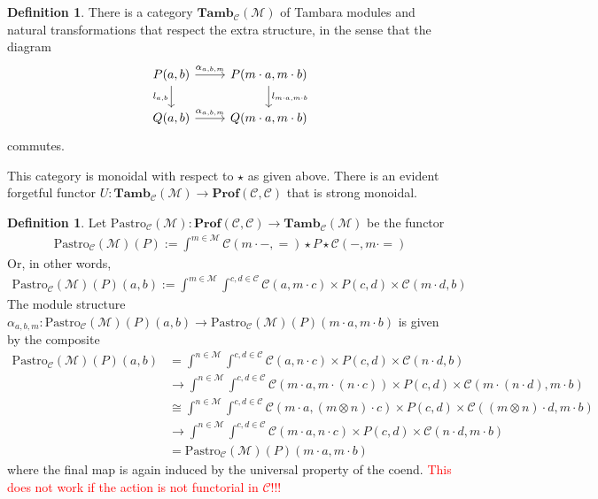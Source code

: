 \documentclass[11pt,a4paper]{amsart}
\theoremstyle{plain}
\theoremstyle{definition}
\newtheorem{definition}[theorem]{Definition}
\newcommand{\C}{\mathscr{C}}
\newcommand{\M}{\mathscr{M}}
\newcommand{\Prof}{\mathbf{Prof}}
\newcommand{\Tamb}{\mathbf{Tamb}}
\newcommand{\todo}[1]{\textcolor{red}{\small #1}}
\begin{document}
\begin{definition}
There is a category $\Tamb_\C(\M)$ of Tambara modules and natural transformations that respect the extra structure, in the sense that the diagram
\[
\begin{tikzcd}
P(a,b) \ar[r, "\alpha_{a,b,m}"] \ar[d, "l_{a,b}" left] & P(m \cdot a, m \cdot b) \ar[d, "l_{m\cdot a,m\cdot b}" right] \\
Q(a,b) \ar[r, "\alpha_{a,b,m}"] & Q(m \cdot a, m \cdot b)
\end{tikzcd}
\]
commutes.
\end{definition}

This category is monoidal with respect to $\star$ as given above. There is an evident forgetful functor $U : \Tamb_\C(\M) \to \Prof(\C, \C)$ that is strong monoidal.

\begin{definition}
Let $\mathrm{Pastro}_\C(\M) : \Prof(\C, \C) \to \Tamb_\C(\M)$ be the functor
\begin{align*}
\mathrm{Pastro}_\C(\M)(P) := \int^{m \in \M} \C(m \cdot -, =) \star P \star \C(-, m \cdot =)
\end{align*}
Or, in other words, 
\begin{align*}
\mathrm{Pastro}_\C(\M)(P)(a,b) := \int^{m \in \M} \int^{c,d \in \C} \C(a, m \cdot c) \times P(c,d) \times  \C(m \cdot d, b)
\end{align*}
The module structure $\alpha_{a,b,m} : \mathrm{Pastro}_\C(\M)(P)(a, b) \to \mathrm{Pastro}_\C(\M)(P)(m \cdot a, m \cdot b)
$ is given by the composite
\begin{align*}
\mathrm{Pastro}_\C(\M)(P)(a,b) &= \int^{n \in \M} \int^{c,d \in \C} \C(a, n \cdot c) \times P(c,d) \times  \C(n \cdot d, b) \\
&\to \int^{n \in \M} \int^{c,d \in \C} \C(m \cdot a, m \cdot (n \cdot c)) \times P(c,d) \times  \C(m \cdot (n \cdot d), m \cdot b) \\
&\cong \int^{n \in \M} \int^{c,d \in \C} \C(m \cdot a, (m \otimes n) \cdot c) \times P(c,d) \times  \C((m \otimes n) \cdot d, m \cdot b) \\
&\to \int^{n \in \M} \int^{c,d \in \C} \C(m \cdot a, n \cdot c) \times P(c,d) \times  \C(n \cdot d, m \cdot b) \\
&= \mathrm{Pastro}_\C(\M)(P)(m \cdot a, m \cdot b)
\end{align*}
where the final map is again induced by the universal property of the coend. \todo{This does not work if the action is not functorial in $\C$!!!}
\end{definition}
\end{document}
